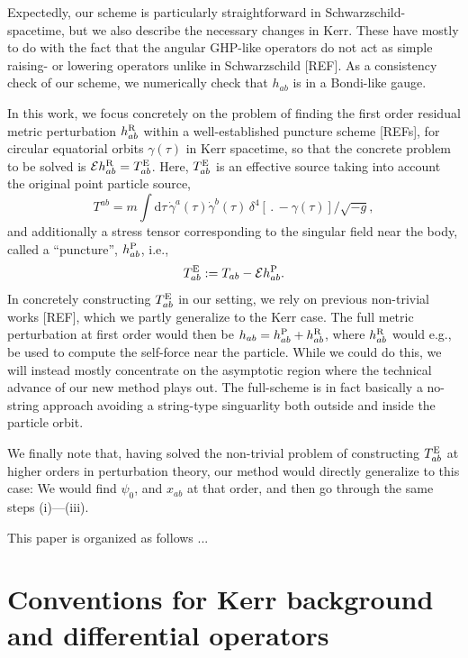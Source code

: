 \documentclass[%
reprint,
 prd,
superscriptaddress,
nofootinbib,
aps,
dvipsnames
]{revtex4-2}
\newcommand{\ud}{\mathrm{d}}
\newcommand{\E}{{\mathcal E}}
\begin{document}
Expectedly, our scheme is particularly straightforward in Schwarzschild-spacetime, but we also describe the necessary changes in Kerr. These have mostly to do with the fact that the angular GHP-like operators do not act as simple raising- or lowering operators unlike in Schwarzschild [REF]. As a consistency check of our scheme, we numerically check that $h_{ab}$ is in a Bondi-like gauge. 

In this work, we focus concretely on the problem of finding the first order residual metric perturbation $h_{ab}^{\rm R}$ within a well-established puncture scheme [REFs], for circular equatorial orbits $\gamma(\tau)$ in Kerr spacetime, so that the concrete problem to be solved is $\E h^{\rm R}_{ab} = T^{\rm E}_{ab}$. Here,
$T_{ab}^{\rm E}$ is an effective source taking into account the original point particle source, 
\begin{equation}
\label{eq:Tabdef}
    T^{ab}=m\int \ud \tau \, \dot \gamma^a(\tau) \dot \gamma^b(\tau) \, \delta^4[ \, . \, - \gamma(\tau)]/\sqrt{-g},
\end{equation}
and additionally a stress tensor corresponding to the singular field near the body, called a ``puncture'', $h^{\rm P}_{ab}$, i.e., 
\begin{equation}
\label{eq:TEdef}
    T_{ab}^{\rm E} := T_{ab} - \E h^{\rm P}_{ab}.
\end{equation}
In concretely constructing $T^{\rm E}_{ab}$ in our setting, we rely on previous non-trivial works [REF], which we partly generalize to the Kerr case.
The full metric perturbation at first order would then be $h_{ab}=h^{\rm P}_{ab} + h^{\rm R}_{ab}$, where $h^{\rm R}_{ab}$ would e.g., be used to compute the self-force near the particle. While we could do this, we will instead mostly concentrate on the asymptotic region where the technical advance of our new method plays out. The full-scheme is in fact basically a no-string approach avoiding a string-type singuarlity both outside and inside the particle orbit.  

We finally note that, having solved the non-trivial problem of constructing $T^{\rm E}_{ab}$ at higher orders in perturbation theory, our method would directly generalize to this case: We would find $\psi_0$, and $x_{ab}$ at that order, and then go through the same steps (i)---(iii).

This paper is organized as follows ...

\section{Conventions for Kerr background and differential operators}
\end{document}
